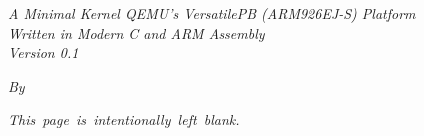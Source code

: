 \doublespacing
{}
\begin{titlepage}
    \begin{center}
        \vspace*{2in}
        \makeatletter
            {\Huge\bfseries \@title \par}
            \vspace{1em}
            \textit{A Minimal Kernel QEMU's VersatilePB (ARM926EJ-S) Platform} \\
            \vspace{1em}
            \textit{Written in Modern C and ARM Assembly} \\
            \vspace{1em}
            \textit{Version 0.1} \\
            \vspace{1em}
            {\large \textit{By \@author} \par}
            \vspace{1em}
            {\small \@date {} \par}
              \vspace{1em}
        \makeatother
    \end{center}
\end{titlepage}

\setcounter{page}{2}

\newpage
\thispagestyle{empty}
\begin{center}
    \mbox{\textit{This page is intentionally left blank.}}
\end{center}